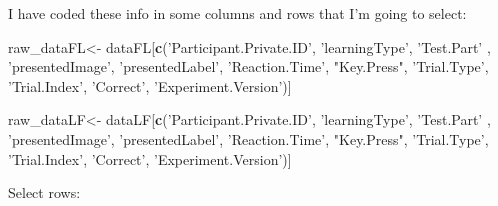 \documentclass[
]{article}
\newenvironment{Shaded}{\begin{snugshade}}{\end{snugshade}}
\newcommand{\KeywordTok}[1]{\textcolor[rgb]{0.13,0.29,0.53}{\textbf{#1}}}
\newcommand{\NormalTok}[1]{#1}
\newcommand{\StringTok}[1]{\textcolor[rgb]{0.31,0.60,0.02}{#1}}
\begin{document}
I have coded these info in some columns and rows that I'm going to
select:

\begin{Shaded}
\begin{Highlighting}[]
\NormalTok{raw_dataFL<-}\StringTok{ }\NormalTok{dataFL[}\KeywordTok{c}\NormalTok{(}\StringTok{'Participant.Private.ID'}\NormalTok{, }\StringTok{'learningType'}\NormalTok{, }\StringTok{'Test.Part'}\NormalTok{ , }
         \StringTok{'presentedImage'}\NormalTok{, }\StringTok{'presentedLabel'}\NormalTok{, }\StringTok{'Reaction.Time'}\NormalTok{, }\StringTok{"Key.Press"}\NormalTok{,}
          \StringTok{'Trial.Type'}\NormalTok{, }\StringTok{'Trial.Index'}\NormalTok{, }\StringTok{'Correct'}\NormalTok{, }\StringTok{'Experiment.Version'}\NormalTok{)]}

\NormalTok{raw_dataLF<-}\StringTok{ }\NormalTok{dataLF[}\KeywordTok{c}\NormalTok{(}\StringTok{'Participant.Private.ID'}\NormalTok{, }\StringTok{'learningType'}\NormalTok{, }\StringTok{'Test.Part'}\NormalTok{ , }
         \StringTok{'presentedImage'}\NormalTok{, }\StringTok{'presentedLabel'}\NormalTok{, }\StringTok{'Reaction.Time'}\NormalTok{, }\StringTok{"Key.Press"}\NormalTok{,}
          \StringTok{'Trial.Type'}\NormalTok{, }\StringTok{'Trial.Index'}\NormalTok{, }\StringTok{'Correct'}\NormalTok{, }\StringTok{'Experiment.Version'}\NormalTok{)]}
\end{Highlighting}
\end{Shaded}

Select rows:
\end{document}
